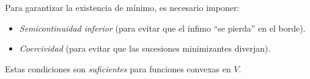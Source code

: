 \documentclass[12pt]{book}
\newtheorem{definition}{Definición}
\newtheorem{ex}{Ejemplo}
\theoremstyle{definition}
\theoremstyle{plain}
\theoremstyle{remark}
\begin{document}
Para garantizar la existencia de mínimo, es necesario imponer:
\begin{itemize}
    \item \emph{Semicontinuidad inferior} (para evitar que el ínfimo ``se pierda'' en el borde).
    \item \emph{Coercividad} (para evitar que las sucesiones minimizantes diverjan).
\end{itemize}
Estas condiciones son \emph{suficientes} para funciones convexas en $V$.





\end{document}
